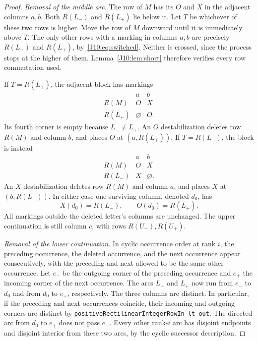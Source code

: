 \documentclass[11pt,oneside]{report}
\theoremstyle{definition}
\numberwithin{equation}{section}
\newcommand{\decl}[1]{\textnormal{\nolinkurl{#1}}}
\begin{document}
\begin{proof}
\textit{Removal of the middle arc.}
The row of $M$ has its $O$ and $X$ in the adjacent columns $a,b$.
Both $R(L_-)$ and $R(L_+)$ lie below it.
Let $T$ be whichever of these two rows is higher.
Move the row of $M$ downward until it is immediately above $T$.
The only other rows with a marking in columns $a,b$ are precisely
$R(L_-)$ and $R(L_+)$, by~\eqref{J10:eq:switched}.
Neither is crossed, since the process stops at the higher of them.
Lemma~\ref{J10:lem:short} therefore verifies every row commutation used.

If $T=R(L_+)$, the adjacent block has markings
\[
\begin{array}{c|cc}
 &a&b\\ \hline
 R(M)&O&X\\
 R(L_+)&\varnothing&O.
\end{array}
\]
Its fourth corner is empty because $L_-\ne L_+$.
An $O$ destabilization deletes row $R(M)$ and column $b$, and
places $O$ at $(a,R(L_+))$.
If $T=R(L_-)$, the block is instead
\[
\begin{array}{c|cc}
 &a&b\\ \hline
 R(M)&O&X\\
 R(L_-)&X&\varnothing.
\end{array}
\]
An $X$ destabilization deletes row $R(M)$ and column $a$, and
places $X$ at $(b,R(L_-))$.
In either case one surviving column, denoted $d_0$, has
\begin{equation}\label{J10:eq:lowercont}
 X(d_0)=R(L_-),\qquad O(d_0)=R(L_+).
\end{equation}
All markings outside the deleted letter's columns are unchanged.
The upper continuation is still column $c$, with rows $R(U_-),R(U_+)$.

\textit{Removal of the lower continuation.}
In cyclic occurrence order at rank $i$, the preceding occurrence,
the deleted occurrence, and the next occurrence appear consecutively,
with the preceding and next allowed to be the same other occurrence.
Let $e_-$ be the outgoing corner of the preceding occurrence and
$e_+$ the incoming corner of the next occurrence.
The arcs $L_-$ and $L_+$ now run from $e_-$ to $d_0$ and from
$d_0$ to $e_+$, respectively.
The three columns are distinct. In particular, if the preceding and
next occurrences coincide, their incoming and outgoing corners are
distinct by \decl{positiveRectilinearIntegerRowIn_lt_out}.
The directed arc from $d_0$ to $e_+$ does not pass $e_-$.
Every other rank-$i$ arc has disjoint endpoints and disjoint interior
from these two arcs, by the cyclic successor description.


\end{proof}
\end{document}
